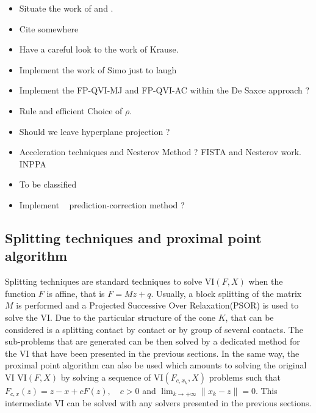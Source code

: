 \begin{ndrva}
  \begin{itemize}
  \item Situate the work of \cite{DeSaxce.Feng90,DeSaxce.Feng1998} and  \cite{Simo.Laursen1992,Laursen.Simo1993b}.
  \item Cite somewhere \citep{Laborde.Renard_MMAS2008}
  \item Have a careful look to the work of Krause.
  \item Implement the work of Simo just to laugh
  \item Implement the FP-QVI-MJ and FP-QVI-AC within the De Saxce approach ?
  \item Rule and efficient Choice of $\rho$.
  \item Should we leave hyperplane projection ?
  \item Acceleration techniques and Nesterov Method ? FISTA and Nesterov work. INPPA 
  \item To be classified \cite{Yan.ea_CMA2008,Han.Lo_CMA2002,Han.Sun_CMA2004,Han_AMC2006,Yan.ea_AMC2009}
  \item Implement ~\citep{He.Liao_JOTA2002} prediction-correction method ?
  \end{itemize}
\end{ndrva}




\subsection{Splitting techniques and proximal point algorithm}

Splitting techniques are standard techniques to solve $\mathrm{VI}(F,X)$ when the function $F$ is affine, that is $F=Mz+q$. Usually, a block splitting of the matrix $M$ is performed and a Projected Successive Over Relaxation(PSOR) is used to solve the VI. Due to the particular structure of the cone $K$, that can be considered is a splitting contact by contact or by group of several contacts. The sub-problems that are generated can be then solved by a dedicated method for the VI that have been presented in the previous sections. In the same way, the proximal point algorithm can also be used which amounts to solving the original VI $\mathrm{VI}(F,X)$ by solving a sequence of $\mathrm{VI}(F_{c,x_k},X)$  problems such that $  F_{c,x}(z) = z - x + c F(z) , \quad c > 0$ and $\lim_ {k \rightarrow +\infty } \|x_k-z\| =0$.
This intermediate VI can be solved with any solvers presented in the previous sections. 

